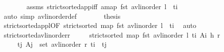 \begin{isabellebody}
\ \ \ \ \ \ \isamarkupfalse%
\ assms\ strict{\isacharunderscore}{\kern0pt}sorted{\isacharunderscore}{\kern0pt}app{\isacharunderscore}{\kern0pt}iff{\isacharbrackleft}{\kern0pt}\ a{\isacharequal}{\kern0pt}{\isachardoublequoteopen}map\ fst\ {\isacharparenleft}{\kern0pt}avl{\isacharunderscore}{\kern0pt}inorder\ l{\isacharparenright}{\kern0pt}\ {\isacharat}{\kern0pt}\ {\isacharbrackleft}{\kern0pt}t\isactrlsub i{\isacharbrackright}{\kern0pt}{\isachardoublequoteclose}{\isacharbrackright}{\kern0pt}\ \isanewline
\ \ \ \ \ \ \isamarkupfalse%
\ {\isacharparenleft}{\kern0pt}auto\ simp{\isacharcolon}{\kern0pt}\ avl{\isacharunderscore}{\kern0pt}inorder{\isacharunderscore}{\kern0pt}def{\isacharparenright}{\kern0pt}\isanewline
\ \ \ \ \isamarkupfalse%
\ \isamarkupfalse%
\ {\isacharquery}{\kern0pt}thesis\isanewline
\ \ \ \ \ \ \isamarkupfalse%
\ strict{\isacharunderscore}{\kern0pt}sorted{\isacharunderscore}{\kern0pt}appl{\isacharbrackleft}{\kern0pt}OF\ {\isacartoucheopen}strict{\isacharunderscore}{\kern0pt}sorted\ {\isacharparenleft}{\kern0pt}map\ fst\ {\isacharparenleft}{\kern0pt}avl{\isacharunderscore}{\kern0pt}inorder\ l{\isacharparenright}{\kern0pt}\ {\isacharat}{\kern0pt}\ {\isacharbrackleft}{\kern0pt}t\isactrlsub i{\isacharbrackright}{\kern0pt}{\isacharparenright}{\kern0pt}{\isacartoucheclose}{\isacharbrackright}{\kern0pt}\ \isamarkupfalse%
\ auto\isanewline
\ \ \isamarkupfalse%
%
\endisatagproof
{\isafoldproof}%
%
\isadelimproof
\isanewline
%
\endisadelimproof
\isanewline
\ \ \isamarkupfalse%
\ strict{\isacharunderscore}{\kern0pt}sorted{\isacharunderscore}{\kern0pt}avl{\isacharunderscore}{\kern0pt}inorder{\isacharunderscore}{\kern0pt}r{\isacharcolon}{\kern0pt}\isanewline
\ \ \ \ \ {\isachardoublequoteopen}strict{\isacharunderscore}{\kern0pt}sorted\ {\isacharparenleft}{\kern0pt}map\ fst\ {\isacharparenleft}{\kern0pt}avl{\isacharunderscore}{\kern0pt}inorder\ {\isasymlangle}l{\isacharcomma}{\kern0pt}\ {\isacharparenleft}{\kern0pt}{\isacharparenleft}{\kern0pt}t\isactrlsub i{\isacharcomma}{\kern0pt}\ A\isactrlsub i{\isacharparenright}{\kern0pt}{\isacharcomma}{\kern0pt}\ h{\isacharparenright}{\kern0pt}{\isacharcomma}{\kern0pt}\ r{\isasymrangle}{\isacharparenright}{\kern0pt}{\isacharparenright}{\kern0pt}{\isachardoublequoteclose}\isanewline
\ \ \ \ \ {\isachardoublequoteopen}{\isasymforall}{\isacharparenleft}{\kern0pt}t\isactrlsub j{\isacharcomma}{\kern0pt}\ A\isactrlsub j{\isacharparenright}{\kern0pt}\ {\isasymin}\ set\ {\isacharparenleft}{\kern0pt}avl{\isacharunderscore}{\kern0pt}inorder\ r{\isacharparenright}{\kern0pt}{\isachardot}{\kern0pt}\ t\isactrlsub i\ {\isacharless}{\kern0pt}\ t\isactrlsub j{\isachardoublequoteclose}\isanewline

\end{isabellebody}
